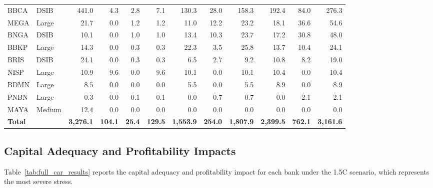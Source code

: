 \begin{landscape}
\begin{longtable}{llrrrrrrrrrr}
BBCA & DSIB & 441.0 & 4.3 & 2.8 & 7.1 & 130.3 & 28.0 & 158.3 & 192.4 & 84.0 & 276.3 \\
MEGA & Large & 21.7 & 0.0 & 1.2 & 1.2 & 11.0 & 12.2 & 23.2 & 18.1 & 36.6 & 54.6 \\
BNGA & DSIB & 10.1 & 0.0 & 1.0 & 1.0 & 13.4 & 10.3 & 23.7 & 17.2 & 30.8 & 48.0 \\
BBKP & Large & 14.3 & 0.0 & 0.3 & 0.3 & 22.3 & 3.5 & 25.8 & 13.7 & 10.4 & 24.1 \\
BRIS & DSIB & 24.1 & 0.0 & 0.3 & 0.3 & 6.5 & 2.7 & 9.2 & 10.8 & 8.2 & 19.0 \\
NISP & Large & 10.9 & 9.6 & 0.0 & 9.6 & 10.1 & 0.0 & 10.1 & 10.4 & 0.0 & 10.4 \\
BDMN & Large & 8.5 & 0.0 & 0.0 & 0.0 & 5.5 & 0.0 & 5.5 & 8.9 & 0.0 & 8.9 \\
PNBN & Large & 0.3 & 0.0 & 0.1 & 0.1 & 0.0 & 0.7 & 0.7 & 0.0 & 2.1 & 2.1 \\
MAYA & Medium & 12.4 & 0.0 & 0.0 & 0.0 & 0.0 & 0.0 & 0.0 & 0.0 & 0.0 & 0.0 \\
\midrule
\textbf{Total} & & \textbf{3,276.1} & \textbf{104.1} & \textbf{25.4} & \textbf{129.5} & \textbf{1,553.9} & \textbf{254.0} & \textbf{1,807.9} & \textbf{2,399.5} & \textbf{762.1} & \textbf{3,161.6} \\
\end{longtable}
\end{landscape}


\subsection{Capital Adequacy and Profitability Impacts}
\label{subsec:full_car}

Table~\ref{tab:full_car_results} reports the capital adequacy and profitability impact for each bank under the 1.5\textdegree C scenario, which represents the most severe stress.


